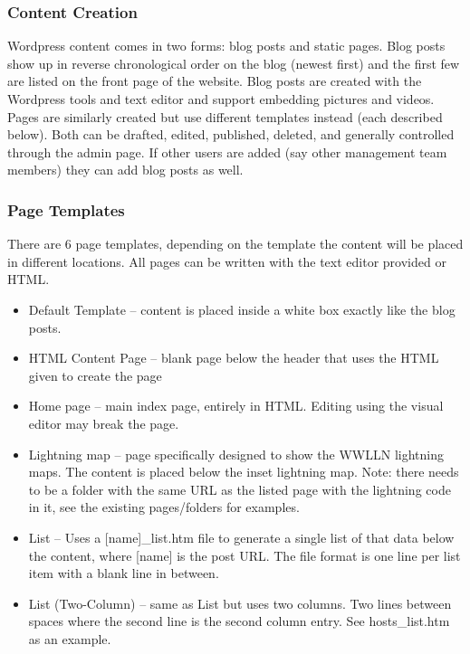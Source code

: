 \subsubsection*{Content Creation}

Wordpress content comes in two forms: blog posts and static pages.
Blog posts show up in reverse chronological order on the blog (newest first) and the first few are listed on the front page of the website.
Blog posts are created with the Wordpress tools and text editor and support embedding pictures and videos.
Pages are similarly created but use different templates instead (each described below).
Both can be drafted, edited, published, deleted, and generally controlled through the admin page.
If other users are added (say other management team members) they can add blog posts as well.

\subsubsection*{Page Templates}

There are 6 page templates, depending on the template the content will be placed in different locations.
All pages can be written with the text editor provided or HTML.

\begin{itemize}
\item Default Template -- content is placed inside a white box exactly like the blog posts.
\item HTML Content Page -- blank page below the header that uses the HTML given to create the page
\item Home page -- main index page, entirely in HTML. 
	Editing using the visual editor may break the page.
\item Lightning map -- page specifically designed to show the WWLLN lightning maps.
	The content is placed below the inset lightning map.
	Note: there needs to be a folder with the same URL as the listed page with the lightning code in it, see the existing pages/folders for examples.
\item List -- Uses a [name]\_list.htm file to generate a single list of that data below the content, where [name] is the post URL.
	The file format is one line per list item with a blank line in between.
\item List (Two-Column) -- same as List but uses two columns.
	Two lines between spaces where the second line is the second column entry.
	See hosts\_list.htm as an example.
\end{itemize}

